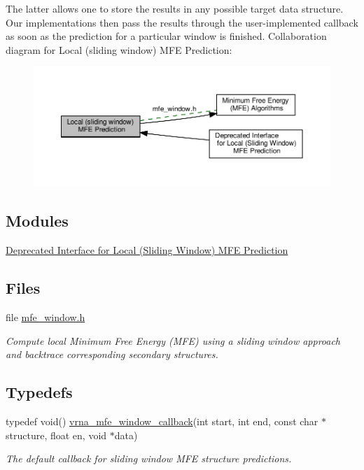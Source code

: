 The latter allows one to store the results in any possible target data structure. Our implementations then pass the results through the user-\/implemented callback as soon as the prediction for a particular window is finished. Collaboration diagram for Local (sliding window) M\+FE Prediction\+:
\nopagebreak
\begin{figure}[H]
\begin{center}
\leavevmode
\includegraphics[width=350pt]{group__mfe__window}
\end{center}
\end{figure}
\subsection*{Modules}
\begin{DoxyCompactItemize}
\item 
\hyperlink{group__mfe__window__deprecated}{Deprecated Interface for Local (\+Sliding Window) M\+F\+E Prediction}
\end{DoxyCompactItemize}
\subsection*{Files}
\begin{DoxyCompactItemize}
\item 
file \hyperlink{mfe__window_8h}{mfe\+\_\+window.\+h}
\begin{DoxyCompactList}\small\item\em Compute local Minimum Free Energy (M\+FE) using a sliding window approach and backtrace corresponding secondary structures. \end{DoxyCompactList}\end{DoxyCompactItemize}
\subsection*{Typedefs}
\begin{DoxyCompactItemize}
\item 
typedef void() \hyperlink{group__mfe__window_ga4f3e5bc214ef803074ace313cb9571b4}{vrna\+\_\+mfe\+\_\+window\+\_\+callback}(int start, int end, const char $\ast$structure, float en, void $\ast$data)
\begin{DoxyCompactList}\small\item\em The default callback for sliding window M\+FE structure predictions. \end{DoxyCompactList}\end{DoxyCompactItemize}

